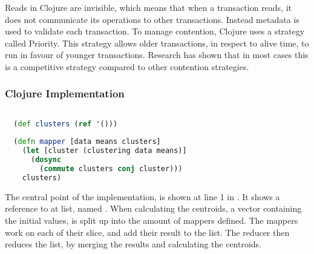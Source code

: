 Reads in Clojure are invisible\cite{nielsen2010benchmarking}, which means that when a transaction reads, it does not communicate its operations to other transactions. Instead metadata is used to validate each transaction. To manage contention, Clojure uses a strategy called Priority\cite{nielsen2010benchmarking}. This strategy allows older transactions, in respect to alive time, to run in favour of younger transactions. Research\cite{nielsen2010benchmarking} has shown that in most cases this is a competitive strategy compared to other contention strategies. 

\subsubsection{Clojure Implementation}
\begin{lstlisting}[float,label=lst:stm_implementation,
  caption={\ac{STM} Implementation},
  language=clojure,  
  showspaces=false,
  showtabs=false,
  breaklines=true,
  showstringspaces=false,
  breakatwhitespace=true,
  commentstyle=\color{greencomments},
  keywordstyle=\color{bluekeywords},
  stringstyle=\color{redstrings}]  % Start your code-block
  
  (def clusters (ref '()))
    
  (defn mapper [data means clusters]
    (let [cluster (clustering data means)]
      (dosync
        (commute clusters conj cluster)))
    clusters)
\end{lstlisting}

The central point of the implementation, is shown at line 1 in . It shows a reference to at list, named . When calculating the centroids, a vector containing the initial values, is split up into the amount of mappers defined. The mappers work on each of their slice, and add their result to the  list. The reducer then reduces the list, by merging the results and calculating the centroids.

